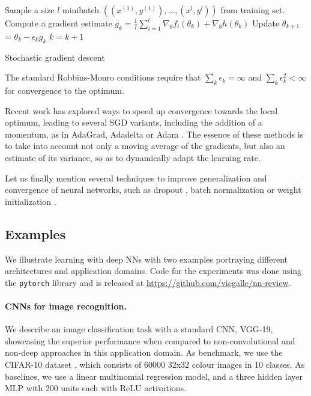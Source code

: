 \begin{algorithm}[!ht]
\begin{algorithmic}[1]
  \State Sample a size $l$ minibatch 
      $((x^{(1)}, y^{(1)}),..., (x^{l},y^{l})) $
              from training set. 
\State Compute a gradient estimate
      $g_k = \frac{1}{l} \sum_{i=1}^l \nabla_{\theta} f_i(\theta_k) + \nabla_{\theta} h(\theta_k)$
\State    Update $\theta_{k+1} $ = $\theta_k -\epsilon _k g_k$ 
\State    $k=k+1$ 
 \EndWhile
\end{algorithmic}
 \caption{Stochastic gradient descent}\label{alg:sgd}
\end{algorithm}

\noindent The standard Robbins-Monro conditions require
that $\sum _k \epsilon_k = \infty$ and 
$\sum _k \epsilon _k^2 < \infty $ for convergence to the optimum.

Recent work has explored ways to 
speed up convergence towards the local optimum, 
leading to several SGD variants, including the 
 addition of a momentum, as in AdaGrad, Adadelta or Adam \parencite{kingma2014adam,duchi2011adaptive,zeiler2012adadelta}. The essence of these methods is to take into account not only a moving average of the gradients, but also an estimate of its variance, so as to dynamically adapt the learning rate. 

Let us finally mention 
several techniques to improve generalization and convergence of neural networks, such as dropout \parencite{srivastava2014dropout}, batch normalization \parencite{ioffe2015batch} or weight initialization \parencite{glorot2010understanding}.



\subsection{Examples}\label{sec:nn_examples}
We illustrate learning with deep NNs with two examples portraying
different architectures and application domains. Code for the experiments was done using the \texttt{pytorch} library \parencite{torch} and is released at \url{https://github.com/vicgalle/nn-review}.

\paragraph{CNNs for image recognition.}\label{kkvision}

We describe an image classification task with a standard CNN, VGG-19, showcasing the superior performance when compared to non-convolutional and non-deep approaches in this application domain. As benchmark, we use the CIFAR-10 dataset \parencite{krizhevsky2014cifar},
which consists of 60000 32x32 colour images in 10 classes. As baselines, we use a linear multinomial regression model, and a three hidden layer MLP with 200 units each with ReLU activations.

